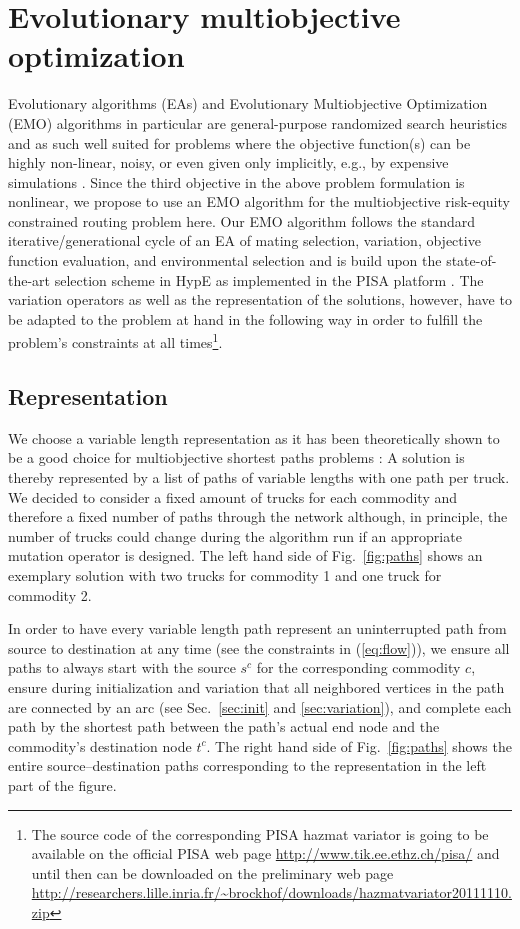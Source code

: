 \documentclass[preprint,12pt]{elsarticle}
\begin{document}
\section{Evolutionary multiobjective optimization}
\label{S_MEO}
Evolutionary algorithms (EAs) and Evolutionary Multiobjective Optimization (EMO) algorithms in particular are general-purpose randomized search heuristics and as such well suited for problems where the objective function(s) can be highly non-linear, noisy, or even given only implicitly, e.g., by expensive simulations \citep{deb2001a,cvl2007a}. Since the third objective in the above problem formulation is nonlinear, we propose to use an EMO algorithm for the multiobjective risk-equity constrained routing problem here. Our EMO algorithm follows the standard iterative/generational cycle of an EA of mating selection, variation, objective function evaluation, and environmental selection and is build upon the state-of-the-art selection scheme in HypE \citep{bz2011a} as implemented in the PISA platform \citep{bltz2003a}. The variation operators as well as the representation of the solutions, however, have to be adapted to the problem at hand in the following way in order to fulfill the problem's constraints at all times\footnote{The source code of the corresponding PISA hazmat variator is going to be available on the official PISA web page \url{http://www.tik.ee.ethz.ch/pisa/} and until then can be downloaded on the preliminary web page \url{http://researchers.lille.inria.fr/~brockhof/downloads/hazmatvariator20111110.zip}}.

\subsection{Representation}
We choose a variable length representation as it has been theoretically shown to be a good choice for multiobjective shortest paths problems \citep{horo2009a}: A solution is thereby represented by a list of paths of variable lengths with one path per truck. We decided to consider a fixed amount of trucks for each commodity and therefore a fixed number of paths through the network although, in principle, the number of trucks could change during the algorithm run if an appropriate mutation operator is designed. The left hand side of Fig.~\ref{fig:paths} shows an exemplary solution with two trucks for commodity 1 and one truck for commodity 2.

In order to have every variable length path represent an uninterrupted path from source to destination at any time (see the constraints in (\ref{eq:flow})), we ensure all paths to always start with the source $s^c$ for the corresponding commodity $c$, ensure during initialization and variation that all neighbored vertices in the path are connected by an arc (see Sec.~\ref{sec:init} and \ref{sec:variation}), and complete each path by the shortest path between the path's actual end node and the commodity's destination node $t^c$. The right hand side of Fig.~\ref{fig:paths} shows the entire source--destination paths corresponding to the representation in the left part of the figure. 
\end{document}
